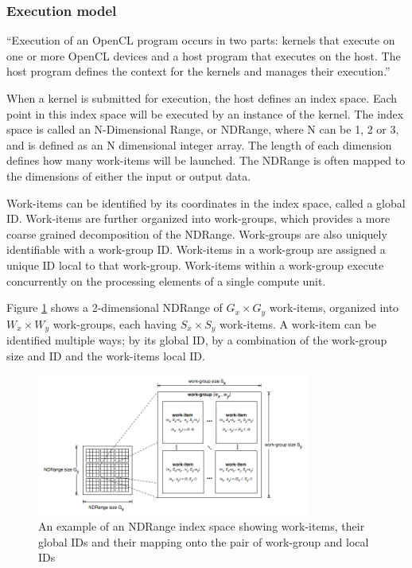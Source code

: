 \subsubsection{Execution model}

``Execution of an OpenCL program occurs in two parts: kernels that
execute on one or more OpenCL devices and a host program that executes
on the host. The host program defines the context for the kernels and
manages their execution.'' \cite{cl-spec}

When a kernel is submitted for execution, the host defines an index
space. Each point in this index space will be executed by an instance
of the kernel. The index space is called an N-Dimensional Range, or
NDRange, where N can be 1, 2 or 3, and is defined as an N dimensional
integer array. The length of each dimension defines how many
work-items will be launched. The NDRange is often mapped to the
dimensions of either the input or output data.

Work-items can be identified by its coordinates in the index space,
called a global ID. Work-items are further organized into work-groups,
which provides a more coarse grained decomposition of the NDRange.
Work-groups are also uniquely identifiable with a work-group ID.
Work-items in a work-group are assigned a unique ID local to that
work-group. Work-items within a work-group execute concurrently on the
processing elements of a single compute unit.

Figure \ref{execution-model-figure} shows a 2-dimensional NDRange of
$G_x \times G_y$ work-items, organized into $W_x \times W_y$
work-groups, each having $S_x \times S_y$ work-items. A work-item can
be identified multiple ways; by its global ID, by a combination of the
work-group size and ID and the work-items local ID.

\begin{figure}[h]
  \centering
  \includegraphics[width=0.8\textwidth]{images/execution-model.png}
  \caption{An example of an NDRange index space showing work-items,
    their global IDs and their mapping onto the pair of work-group and
    local IDs}
  \label{execution-model-figure}
\end{figure}


